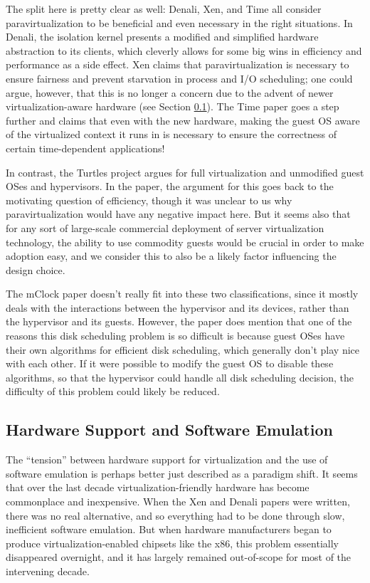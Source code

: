 \documentclass[letterpaper, twocolumn]{article}
\begin{document}
The split here is pretty clear as well: Denali, Xen, and Time all consider
paravirtualization to be beneficial and even necessary in the right situations.
In Denali, the isolation kernel presents a modified and simplified hardware abstraction
to its clients, which cleverly allows for some big wins in efficiency and performance
as a side effect.  Xen claims that paravirtualization is necessary to ensure fairness
and prevent starvation in process and I/O scheduling; one could argue, however, that
this is no longer a concern due to the advent of newer virtualization-aware hardware
(see Section \ref{sec:relns/hard-emul}).  The Time paper goes a step further and claims that
even with the new hardware, making the guest OS aware of the virtualized context it
runs in is necessary to ensure the correctness of certain time-dependent applications!

In contrast, the Turtles project argues for full virtualization and unmodified guest
OSes and hypervisors.  In the paper, the argument for this goes back to the
motivating question of efficiency, though it was unclear to us why paravirtualization
would have any negative impact here.  But it seems also that for any sort of large-scale
commercial deployment of server virtualization technology, the ability to use commodity
guests would be crucial in order to make adoption easy, and we consider this to also
be a likely factor influencing the design choice.

The mClock paper doesn't really fit into these two classifications, since it mostly
deals with the interactions between the hypervisor and its devices, rather than the hypervisor
and its guests.  However, the paper does mention that one of the reasons this disk
scheduling problem is so difficult is because guest OSes have their own algorithms
for efficient disk scheduling, which generally don't play nice with each other.  If it
were possible to modify the guest OS to disable these algorithms, so that the hypervisor
could handle all disk scheduling decision, the difficulty of this problem could likely
be reduced.

\subsection{Hardware Support and Software Emulation}
\label{sec:relns/hard-emul}

The ``tension'' between hardware support for virtualization and the use of software
emulation is perhaps better just described as a paradigm shift.  It seems
that over the last decade virtualization-friendly hardware has become commonplace
and inexpensive.  When the Xen and Denali papers were written, there was no real
alternative, and so everything had to be done through slow, inefficient software emulation.
But when hardware manufacturers began to produce virtualization-enabled chipsets
like the x86, this problem essentially disappeared overnight, and it has largely
remained out-of-scope for most of the intervening decade.
\end{document}

